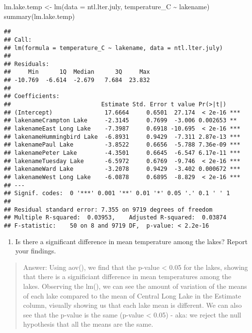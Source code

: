 \documentclass[
]{article}
\newenvironment{Shaded}{\begin{snugshade}}{\end{snugshade}}
\newcommand{\AttributeTok}[1]{\textcolor[rgb]{0.77,0.63,0.00}{#1}}
\newcommand{\FunctionTok}[1]{\textcolor[rgb]{0.00,0.00,0.00}{#1}}
\newcommand{\NormalTok}[1]{#1}
\newcommand{\OtherTok}[1]{\textcolor[rgb]{0.56,0.35,0.01}{#1}}
\newcommand{\SpecialCharTok}[1]{\textcolor[rgb]{0.00,0.00,0.00}{#1}}
\providecommand{\tightlist}{%
  \setlength{\itemsep}{0pt}\setlength{\parskip}{0pt}}
\begin{document}
\begin{Shaded}
\begin{Highlighting}[]
\NormalTok{lm.lake.temp }\OtherTok{\textless{}{-}} \FunctionTok{lm}\NormalTok{(}\AttributeTok{data =}\NormalTok{ ntl.lter.july, temperature\_C }\SpecialCharTok{\textasciitilde{}}\NormalTok{ lakename)}
\FunctionTok{summary}\NormalTok{(lm.lake.temp)}
\end{Highlighting}
\end{Shaded}

\begin{verbatim}
## 
## Call:
## lm(formula = temperature_C ~ lakename, data = ntl.lter.july)
## 
## Residuals:
##     Min      1Q  Median      3Q     Max 
## -10.769  -6.614  -2.679   7.684  23.832 
## 
## Coefficients:
##                          Estimate Std. Error t value Pr(>|t|)    
## (Intercept)               17.6664     0.6501  27.174  < 2e-16 ***
## lakenameCrampton Lake     -2.3145     0.7699  -3.006 0.002653 ** 
## lakenameEast Long Lake    -7.3987     0.6918 -10.695  < 2e-16 ***
## lakenameHummingbird Lake  -6.8931     0.9429  -7.311 2.87e-13 ***
## lakenamePaul Lake         -3.8522     0.6656  -5.788 7.36e-09 ***
## lakenamePeter Lake        -4.3501     0.6645  -6.547 6.17e-11 ***
## lakenameTuesday Lake      -6.5972     0.6769  -9.746  < 2e-16 ***
## lakenameWard Lake         -3.2078     0.9429  -3.402 0.000672 ***
## lakenameWest Long Lake    -6.0878     0.6895  -8.829  < 2e-16 ***
## ---
## Signif. codes:  0 '***' 0.001 '**' 0.01 '*' 0.05 '.' 0.1 ' ' 1
## 
## Residual standard error: 7.355 on 9719 degrees of freedom
## Multiple R-squared:  0.03953,    Adjusted R-squared:  0.03874 
## F-statistic:    50 on 8 and 9719 DF,  p-value: < 2.2e-16
\end{verbatim}

\begin{enumerate}
\def\labelenumi{\arabic{enumi}.}
\setcounter{enumi}{12}
\tightlist
\item
  Is there a significant difference in mean temperature among the lakes?
  Report your findings.
\end{enumerate}

\begin{quote}
Answer: Using aov(), we find that the p-value \textless{} 0.05 for the
lakes, showing that there is a significiant difference in mean
temperatures among the lakes. Observing the lm(), we can see the amount
of variation of the means of each lake compared to the mean of Central
Long Lake in the Estimate column, visually showing us that each lake
mean is different. We can also see that the p-value is the same (p-value
\textless{} 0.05) - aka: we reject the null hypothesis that all the
means are the same.
\end{quote}
\end{document}
